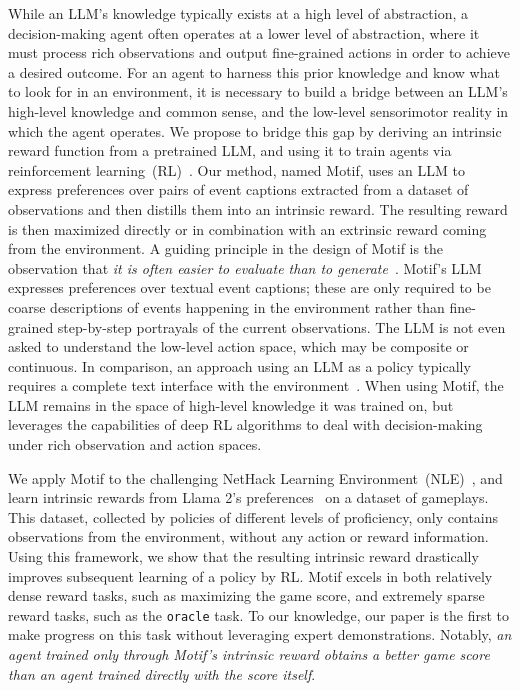 \documentclass{article} %
\begin{document}
While an LLM's knowledge typically exists at a high level of abstraction, a decision-making agent often operates at a lower level of abstraction, where it must process rich observations and output fine-grained actions in order to achieve a desired outcome.
For an agent to harness this prior knowledge and know what to look for in an environment, it is necessary to build a bridge between an LLM's high-level knowledge and common sense, and the low-level sensorimotor reality in which the agent operates. 
We propose to bridge this gap by deriving an intrinsic reward function from a pretrained LLM, and using it to train agents via reinforcement learning~(RL)~\citep{sutton2018reinforcement}.
Our method, named Motif, uses an LLM to express preferences over pairs of event captions extracted from a dataset of observations and then distills them into an intrinsic reward.
The resulting reward is then maximized directly or in combination with an extrinsic reward coming from the environment.
A guiding principle in the design of Motif is the observation that \emph{it is often easier to evaluate than to generate}~\citep{Sutton2001Verification,schulman2023proxy}. 
Motif's LLM expresses preferences over textual event captions;
these are only required to be coarse descriptions of events happening in the environment rather than fine-grained step-by-step portrayals of the current observations.
The LLM is not even asked to understand the low-level action space, which may be composite or continuous. In comparison, an approach using an LLM as a policy typically requires a complete text interface with the environment~\citep{wang2023voyager,yao2022react}.
When using Motif, the LLM remains in the space of high-level knowledge it was trained on, but leverages the capabilities of deep RL algorithms to deal with decision-making under rich observation and action spaces.

We apply Motif to the challenging NetHack Learning Environment~(NLE)~\citep{KuttlerNMRSGR20}, and learn intrinsic rewards from Llama 2's preferences~\citep{touvron2023llama} on a dataset of gameplays. This dataset, collected by policies of different levels of proficiency, only contains observations from the environment, without any action or reward information.
Using this framework, we show that the resulting intrinsic reward drastically improves subsequent learning of a policy by RL.
Motif excels in both relatively dense reward tasks, such as maximizing the game score, and extremely sparse reward tasks, such as the \texttt{oracle} task. 
To our knowledge, our paper is the first to make progress on this task without leveraging expert demonstrations.
Notably, \emph{an agent trained only through Motif's intrinsic reward obtains a better game score than an agent trained directly with the score itself}.
\end{document}
